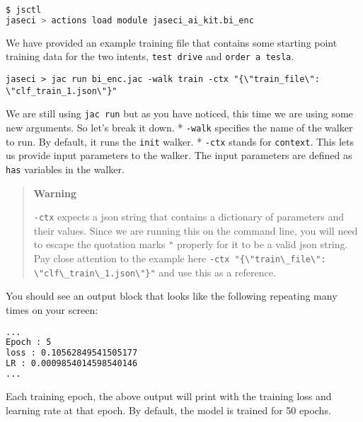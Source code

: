 \begin{lstlisting}[language=bash]
$ jsctl
jaseci > actions load module jaseci_ai_kit.bi_enc
\end{lstlisting}

We have provided an example training file that contains some starting
point training data for the two intents,
\passthrough{\lstinline!test drive!} and
\passthrough{\lstinline!order a tesla!}.

\begin{lstlisting}
jaseci > jac run bi_enc.jac -walk train -ctx "{\"train_file\": \"clf_train_1.json\"}"
\end{lstlisting}

We are still using \passthrough{\lstinline!jac run!} but as you have
noticed, this time we are using some new arguments. So let's break it
down. * \passthrough{\lstinline!-walk!} specifies the name of the walker
to run. By default, it runs the \passthrough{\lstinline!init!} walker. *
\passthrough{\lstinline!-ctx!} stands for
\passthrough{\lstinline!context!}. This lets us provide input parameters
to the walker. The input parameters are defined as
\passthrough{\lstinline!has!} variables in the walker.

\begin{quote}
\textbf{Warning}

\passthrough{\lstinline!-ctx!} expects a json string that contains a
dictionary of parameters and their values. Since we are running this on
the command line, you will need to escape the quotation marks
\passthrough{\lstinline!"!} properly for it to be a valid json string.
Pay close attention to the example here
\passthrough{\lstinline!-ctx "\{\\"train\_file\\": \\"clf\_train\_1.json\\"\}"!}
and use this as a reference.
\end{quote}

You should see an output block that looks like the following repeating
many times on your screen:

\begin{lstlisting}[language=bash]
...
Epoch : 5
loss : 0.10562849541505177
LR : 0.0009854014598540146
...
\end{lstlisting}

Each training epoch, the above output will print with the training loss
and learning rate at that epoch. By default, the model is trained for 50
epochs.

